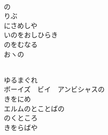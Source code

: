 \documentclass[10pt,b5j]{tarticle} %
\begin{document}
\begin{enumerate}
\begin{minipage}[c]{\blocksize}
    \end{minipage}
    \begin{minipage}[c]{\blocksize}
        
        \vspace{\linespace}
        \item~\\
        の\\
        りぶ\\
        にさめしや\\
        いのをおしひらき\\
        のをむなる\\
        おヽの
        
    \end{minipage}
    \begin{minipage}[c]{\blocksize}
        
        \vspace{\linespace}
        \item~\\
        ゆるまぐれ\\
        ボーイズ　ビイ　アンビシャスの\\
        きをにめ\\
        エルムのとことばの\\
        のくところ\\
        きをらばや
    
    \end{minipage}
\end{enumerate} %
\end{document}

